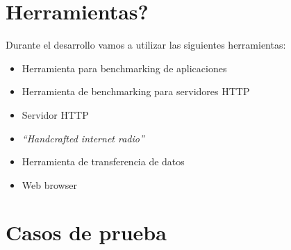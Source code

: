 \documentclass[11pt,a4paper,titlepage]{article}
\begin{document}
\section{Herramientas?}
    Durante el desarrollo vamos a utilizar las siguientes herramientas:
    \begin{itemize}
        \item {} Herramienta para benchmarking de aplicaciones
        \item {} Herramienta de benchmarking para servidores HTTP
        \item {} Servidor HTTP
        \item {} \emph{``Handcrafted internet radio''}
        \item {} Herramienta de transferencia de datos
        \item {} Web browser
    \end{itemize}

\section{Casos de prueba}
\end{document}
